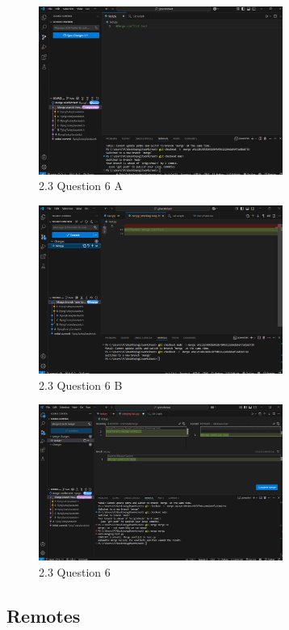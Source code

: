 \documentclass[10pt,twocolumn]{article}
\begin{document}
\begin{enumerate}
\begin{figure}[htp]
    \centering
    \includegraphics[width=8cm]{Q6.1.png}
    \caption{2.3 Question 6 A}
\end{figure}\textbf{}
\begin{figure}[htp]
    \centering
    \includegraphics[width=8cm]{Q6.2.png}
    \caption{2.3 Question 6 B}
\end{figure}\textbf{}
\begin{figure}[htp]
    \centering
    \includegraphics[width=8cm]{Q6.3.png}
    \caption{2.3 Question 6 }
\end{figure}\textbf{}



\end{enumerate}

\subsection{Remotes}
\end{document}
